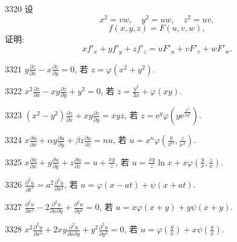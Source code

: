 \begin{prob}[M]{3320}
设
\[
x^2 = vw, \quad y^2 = uw, \quad z^2 = uv,
\]
\[
f(x, y, z) = F(u, v, w),
\]
证明:
\[
x f'_x + y f'_y + z f'_z = u F'_u + v F'_v + w F'_w.
\]
\end{prob}


\begin{prob}[S]{3321}
$y\frac{\partial z}{\partial x} - x\frac{\partial z}{\partial y} = 0$, 若 $z = \varphi(x^2 + y^2)$.
\end{prob}

\begin{prob}[S]{3322}
$x^2\frac{\partial z}{\partial x} - xy\frac{\partial z}{\partial y} + y^2 = 0$, 若 $z = \frac{y^2}{3x} + \varphi(xy)$.
\end{prob}

\begin{prob}[S]{3323}
$(x^2 - y^2)\frac{\partial z}{\partial x} + xy\frac{\partial z}{\partial y} = xyz$, 若 $z = \mathrm{e}^y \varphi\left(y\mathrm{e}^{\frac{x^2}{2y^2}}\right)$.
\end{prob}

\begin{prob}[S]{3324}
$x\frac{\partial u}{\partial x} + \alpha y\frac{\partial u}{\partial y} + \beta z\frac{\partial u}{\partial z} = nu$, 若 $u = x^n \varphi\left(\frac{y}{x^\alpha}, \frac{z}{x^\beta}\right)$.
\end{prob}

\begin{prob}[S]{3325}
$x\frac{\partial u}{\partial x} + y\frac{\partial u}{\partial y} + z\frac{\partial u}{\partial z} = u + \frac{xy}{z}$, 若 $u = \frac{xy}{z}\ln x + x\varphi\left(\frac{y}{x}, \frac{z}{x}\right)$.
\end{prob}

\begin{prob}[S]{3326}
$\frac{\partial^2 u}{\partial t^2} = a^2\frac{\partial^2 u}{\partial x^2}$, 若 $u = \varphi(x - at) + \psi(x + at)$.
\end{prob}

\begin{prob}[S]{3327}
$\frac{\partial^2 u}{\partial x^2} - 2\frac{\partial^2 u}{\partial x\partial y} + \frac{\partial^2 u}{\partial y^2} = 0$, 若 $u = x\varphi(x + y) + y\psi(x + y)$.
\end{prob}

\begin{prob}[S]{3328}
$x^2\frac{\partial^2 u}{\partial x^2} + 2xy\frac{\partial^2 u}{\partial x\partial y} + y^2\frac{\partial^2 u}{\partial y^2} = 0$, 若 $u = \varphi\left(\frac{y}{x}\right) + x\psi\left(\frac{y}{x}\right)$.
\end{prob}

